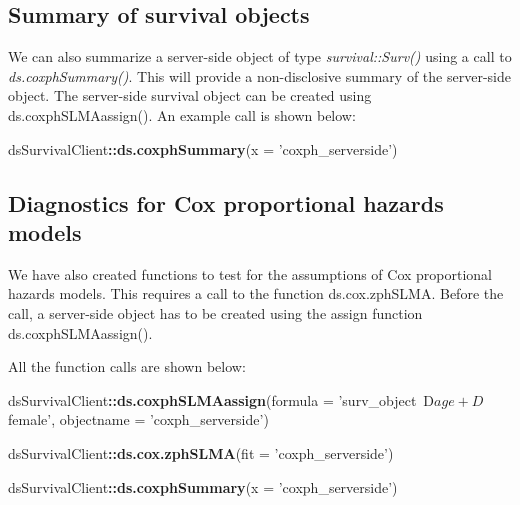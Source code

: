 \documentclass[
]{article}
\newenvironment{Shaded}{\begin{snugshade}}{\end{snugshade}}
\newcommand{\DataTypeTok}[1]{\textcolor[rgb]{0.13,0.29,0.53}{#1}}
\newcommand{\KeywordTok}[1]{\textcolor[rgb]{0.13,0.29,0.53}{\textbf{#1}}}
\newcommand{\NormalTok}[1]{#1}
\newcommand{\OperatorTok}[1]{\textcolor[rgb]{0.81,0.36,0.00}{\textbf{#1}}}
\newcommand{\StringTok}[1]{\textcolor[rgb]{0.31,0.60,0.02}{#1}}
\begin{document}
\hypertarget{summary-of-survival-objects}{%
\subsection{Summary of survival
objects}\label{summary-of-survival-objects}}

We can also summarize a server-side object of type
\emph{survival::Surv()} using a call to \emph{ds.coxphSummary()}. This
will provide a non-disclosive summary of the server-side object. The
server-side survival object can be created using ds.coxphSLMAassign().
An example call is shown below:

\begin{Shaded}
\begin{Highlighting}[]
\NormalTok{dsSurvivalClient}\OperatorTok{::}\KeywordTok{ds.coxphSummary}\NormalTok{(}\DataTypeTok{x =} \StringTok{'coxph_serverside'}\NormalTok{)}
\end{Highlighting}
\end{Shaded}

\hypertarget{diagnostics-for-cox-proportional-hazards-models}{%
\subsection{Diagnostics for Cox proportional hazards
models}\label{diagnostics-for-cox-proportional-hazards-models}}

We have also created functions to test for the assumptions of Cox
proportional hazards models. This requires a call to the function
ds.cox.zphSLMA. Before the call, a server-side object has to be created
using the assign function ds.coxphSLMAassign().

All the function calls are shown below:

\begin{Shaded}
\begin{Highlighting}[]
\NormalTok{dsSurvivalClient}\OperatorTok{::}\KeywordTok{ds.coxphSLMAassign}\NormalTok{(}\DataTypeTok{formula =} \StringTok{'surv_object~D$age+D$female'}\NormalTok{,}
                            \DataTypeTok{objectname =} \StringTok{'coxph_serverside'}\NormalTok{)}
                
\NormalTok{dsSurvivalClient}\OperatorTok{::}\KeywordTok{ds.cox.zphSLMA}\NormalTok{(}\DataTypeTok{fit =} \StringTok{'coxph_serverside'}\NormalTok{)}

\NormalTok{dsSurvivalClient}\OperatorTok{::}\KeywordTok{ds.coxphSummary}\NormalTok{(}\DataTypeTok{x =} \StringTok{'coxph_serverside'}\NormalTok{)}
\end{Highlighting}
\end{Shaded}
\end{document}
